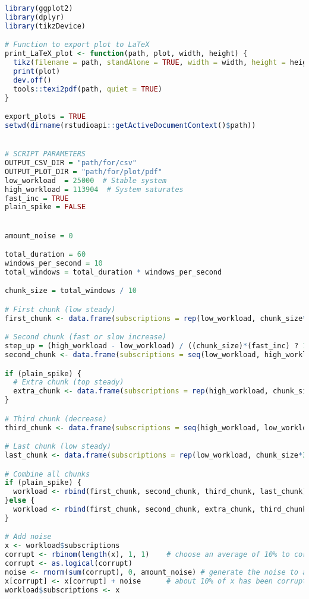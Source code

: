 \begin{lstlisting}[language=R, caption={Programa en R que genera una carga de subscripciones con un pico puntual, como en la \autoref{fig:subsworkload_20k-100k}}]
library(ggplot2)
library(dplyr)
library(tikzDevice)

# Function to export plot to LaTeX
print_LaTeX_plot <- function(path, plot, width, height) {
  tikz(filename = path, standAlone = TRUE, width = width, height = height)
  print(plot)
  dev.off()
  tools::texi2pdf(path, quiet = TRUE)
}

export_plots = TRUE
setwd(dirname(rstudioapi::getActiveDocumentContext()$path))


# SCRIPT PARAMETERS
OUTPUT_CSV_DIR = "path/for/csv"
OUTPUT_PLOT_DIR = "path/for/plot/pdf"
low_workload  = 25000  # Stable system
high_workload = 113904  # System saturates
fast_inc = TRUE
plain_spike = FALSE


amount_noise = 0

total_duration = 60
windows_per_second = 10
total_windows = total_duration * windows_per_second

chunk_size = total_windows / 10

# First chunk (low steady)
first_chunk <- data.frame(subscriptions = rep(low_workload, chunk_size*3))

# Second chunk (fast or slow increase)
step_up = (high_workload - low_workload) / ((chunk_size)*(fast_inc) ? 10 : 1)
second_chunk <- data.frame(subscriptions = seq(low_workload, high_workload, step_up))

if (plain_spike) {
  # Extra chunk (top steady)
  extra_chunk <- data.frame(subscriptions = rep(high_workload, chunk_size*0.5))
}

# Third chunk (decrease)
third_chunk <- data.frame(subscriptions = seq(high_workload, low_workload, -step_up))

# Last chunk (low steady)
last_chunk <- data.frame(subscriptions = rep(low_workload, chunk_size*3))

# Combine all chunks
if (plain_spike) {
  workload <- rbind(first_chunk, second_chunk, third_chunk, last_chunk)
}else {
  workload <- rbind(first_chunk, second_chunk, extra_chunk, third_chunk, last_chunk)
}

# Add noise
x <- workload$subscriptions
corrupt <- rbinom(length(x), 1, 1)    # choose an average of 10% to corrupt at random
corrupt <- as.logical(corrupt)
noise <- rnorm(sum(corrupt), 0, amount_noise) # generate the noise to add
x[corrupt] <- x[corrupt] + noise      # about 10% of x has been corrupted
workload$subscriptions <- x


\end{lstlisting}
